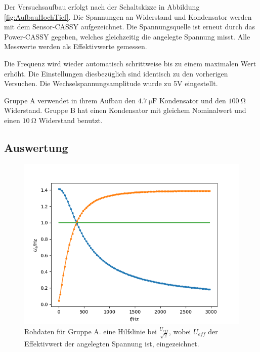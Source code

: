 \documentclass[12pt,a4paper]{article}
\begin{document}
Der Versuchsaufbau erfolgt nach der Schaltskizze in Abbildung \ref{fig:AufbauHochTief}. Die Spannungen an Widerstand und Kondensator
werden mit dem Sensor-CASSY aufgezeichnet. Die Spannungsquelle ist erneut durch das Power-CASSY gegeben, welches gleichzeitig die angelegte Spannung misst. Alle Messwerte werden als Effektivwerte gemessen.

Die Frequenz wird wieder automatisch schrittweise bis zu einem maximalen Wert erhöht. Die Einstellungen diesbezüglich sind identisch zu den vorherigen Versuchen. Die Wechselspannungsamplitude wurde zu 5V eingestellt.

Gruppe A verwendet in ihrem Aufbau den $\SI{4,7}{\micro \F}$ Kondensator und den $\SI{100}{\ohm}$ Widerstand. Gruppe B hat einen Kondensator mit gleichem Nominalwert und einen $\SI{10}{\ohm}$ Widerstand benutzt.

\subsection{Auswertung}

\begin{figure}
\centering
\includegraphics[scale=1.0]{Bilder/RohdatenHochTief_A.png}
\caption{Rohdaten für Gruppe A. eine Hilfslinie bei $\frac{U_{eff}}{\sqrt{2}}$, wobei $U_{eff}$ der Effektivwert der angelegten Spannung ist, eingezeichnet.}
\label{fig:RohdatenHochTief_A}
\end{figure}
\end{document}
